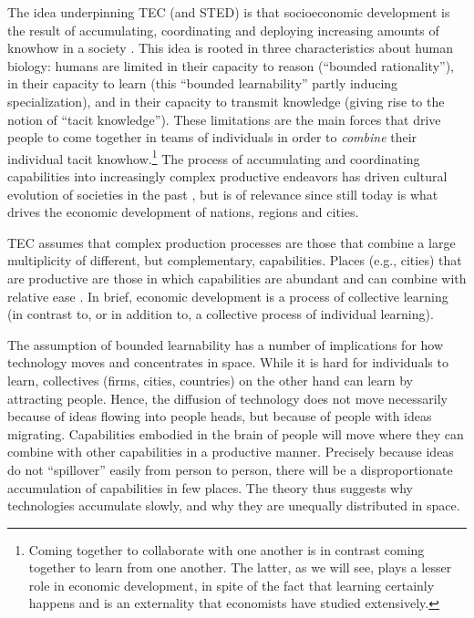\documentclass[12pt]{article}
\begin{document}
The idea underpinning TEC (and STED) is that socioeconomic development is the result of accumulating, coordinating and deploying increasing amounts of knowhow in a society \citep{HidalgoEtAl2007,HidalgoHausmann2009,HausmannHidalgo2011}. This idea is rooted in three characteristics about human biology: humans are limited in their capacity to reason (``bounded rationality''), in their capacity to learn (this ``bounded learnability'' partly inducing specialization), and in their capacity to transmit knowledge (giving rise to the notion of ``tacit knowledge''). These limitations are the main forces that drive people to come together in teams of individuals in order to \emph{combine} their individual tacit knowhow.\footnote{Coming together to collaborate with one another is in contrast coming together to learn from one another. The latter, as we will see, plays a lesser role in economic development, in spite of the fact that learning certainly happens and is an externality that economists have studied extensively.} The process of accumulating and coordinating capabilities into increasingly complex productive endeavors has driven cultural evolution of societies in the past \cite{henrich2015secret}, but is of relevance since still today is what drives the economic development of nations, regions and cities. 

TEC assumes that complex production processes are those that combine a large multiplicity of different, but complementary, capabilities. Places (e.g., cities) that are productive are those in which capabilities are abundant and can combine with relative ease \citep{gomez2016explaining,neffke2017coworker}. In brief, economic development is a process of collective learning (in contrast to, or in addition to, a collective process of individual learning).

The assumption of bounded learnability has a number of implications for how technology moves and concentrates in space. While it is hard for individuals to learn, collectives (firms, cities, countries) on the other hand can learn by attracting people. Hence, the diffusion of technology does not move necessarily because of ideas flowing into people heads, but because of people with ideas migrating. Capabilities embodied in the brain of people will move where they can combine with other capabilities in a productive manner. Precisely because ideas do not ``spillover'' easily from person to person, there will be a disproportionate accumulation of capabilities in few places. The theory thus suggests why technologies accumulate slowly, and why they are unequally distributed in space. 
\end{document}

